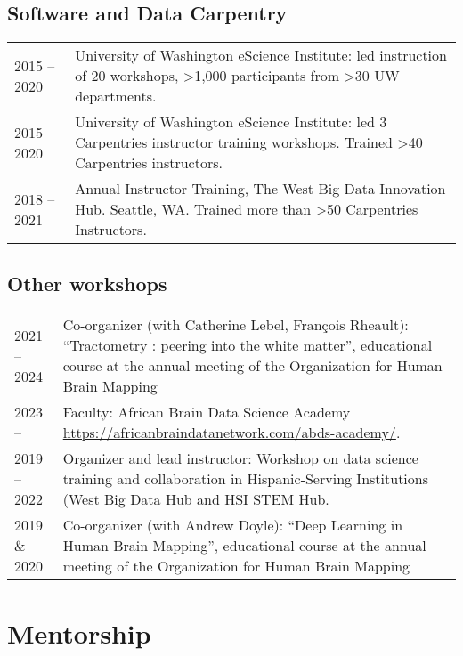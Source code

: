 \documentclass[11pt,fullpage]{article}
\begin{document}
\subsection*{Software and Data Carpentry}
\begin{tabular}{p{}p{}}
 2015 -- 2020 & University of Washington eScience Institute: led instruction of 20 workshops, >1,000 participants from >30 UW departments. \\
 2015 -- 2020 & University of Washington eScience Institute: led 3 Carpentries instructor training workshops. Trained >40 Carpentries instructors.\\
 2018 -- 2021 & Annual Instructor Training, The West Big Data Innovation Hub. Seattle, WA. Trained more than >50 Carpentries Instructors.
\end{tabular}

\subsection*{Other workshops}
\begin{tabular}{p{}p{}}
2021 -- 2024 & Co-organizer (with Catherine Lebel, Fran\c{c}ois Rheault): ``Tractometry : peering into the white matter'', educational course at the annual meeting of the Organization for Human Brain Mapping \\
2023 -- & Faculty: African Brain Data Science Academy \url{https://africanbraindatanetwork.com/abds-academy/}.\\
2019 -- 2022 & Organizer and lead instructor: Workshop on data science training and collaboration in Hispanic-Serving Institutions (West Big Data Hub and HSI STEM Hub. \\
2019 \& 2020 & Co-organizer (with Andrew Doyle): ``Deep Learning in Human Brain Mapping'', educational course at the annual meeting of the Organization for Human Brain Mapping\\

\end{tabular}
\section*{Mentorship}
\end{document}
